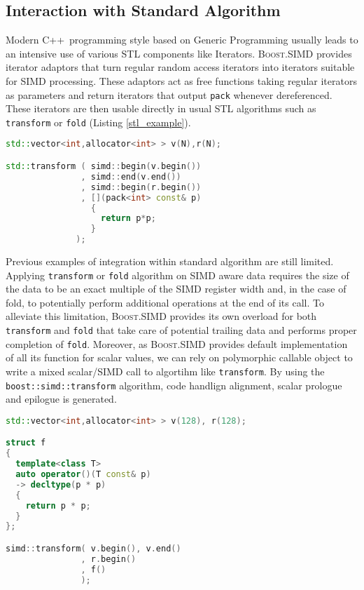 \documentclass[preprint]{sigplanconf}
\providecommand{\boostsimd}{\textsc{Boost.SIMD}}
\providecommand{\cpp}[1][~]{\textsc{C++}#1}
\begin{document}
\subsection{Interaction with Standard Algorithm}
Modern \cpp programming style based on Generic Programming usually leads to an
intensive use of various STL components like Iterators. \boostsimd{} provides
iterator adaptors that turn regular random access iterators into iterators
suitable for SIMD processing. These adaptors act as free functions taking
regular iterators as parameters and return iterators that output \texttt{pack}
whenever dereferenced. These iterators are then usable directly in usual STL
algorithms such as \texttt{transform} or \texttt{fold} (Listing \ref{stl_example}).

\begin{lstlisting}[language=c++, label={lst:square-cxx}, caption={SIMD Iterator with STL algorithm},label=stl_example]
std::vector<int,allocator<int> > v(N),r(N);

std::transform ( simd::begin(v.begin())
               , simd::end(v.end())
               , simd::begin(r.begin())
               , [](pack<int> const& p)
                 { 
                   return p*p; 
                 } 
              );
\end{lstlisting}

Previous examples of integration within standard algorithm are still limited.
Applying \texttt{transform} or \texttt{fold} algorithm on SIMD aware data
requires the size of the data to be an exact multiple of the SIMD register width
and, in the case of fold, to potentially perform additional operations at the
end of its call. To alleviate this limitation, \boostsimd{}
provides its own overload for both \texttt{transform} and \texttt{fold} that take
care of potential trailing data and performs proper completion of \texttt{fold}.
Moreover, as \boostsimd{} provides default implementation of all its function for scalar values,
we can rely on polymorphic callable object to write a mixed scalar/SIMD call to algortihm
like \texttt{transform}. By using the \texttt{boost::simd::transform} algorithm, code
handlign alignment, scalar prologue and epilogue is generated.

\begin{lstlisting}[language=c++, label={lst:square-cxx}, caption={Polymorphic SIMD algorithm call},label=stl_poly]
std::vector<int,allocator<int> > v(128), r(128);

struct f
{
  template<class T>
  auto operator()(T const& p)
  -> decltype(p * p)
  {
    return p * p;
  }
};

simd::transform( v.begin(), v.end()
               , r.begin()
               , f() 
               );
\end{lstlisting}
\end{document}
